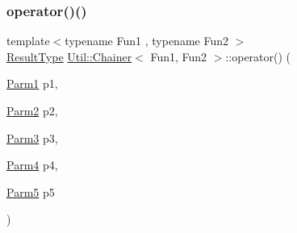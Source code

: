 \mbox{\label{classUtil_1_1Chainer_a3aee5b0f14ad8a15d167dd319019a01a}} 
\subsubsection{\texorpdfstring{operator()()}{operator()()}\hspace{0.1cm}{\footnotesize\ttfamily [17/18]}}
{\footnotesize\ttfamily template$<$typename Fun1 , typename Fun2 $>$ \\
\mbox{\hyperlink{classUtil_1_1Chainer_a2c8d88a77b8ba93eb915dc799ddafbb9}{Result\+Type}} \mbox{\hyperlink{classUtil_1_1Chainer}{Util\+::\+Chainer}}$<$ Fun1, Fun2 $>$\+::operator() (\begin{DoxyParamCaption}\item[{\mbox{\hyperlink{classUtil_1_1Chainer_a3e09b2267dabdd8d12070b09c47749c6}{Parm1}}}]{p1,  }\item[{\mbox{\hyperlink{classUtil_1_1Chainer_a1bfb0e8f35679278c85d232a74a107ff}{Parm2}}}]{p2,  }\item[{\mbox{\hyperlink{classUtil_1_1Chainer_ac28811d7153f7b7cf837f7b8626436c8}{Parm3}}}]{p3,  }\item[{\mbox{\hyperlink{classUtil_1_1Chainer_a82e756f3083e3883a05644425474f789}{Parm4}}}]{p4,  }\item[{\mbox{\hyperlink{classUtil_1_1Chainer_ac5fdddd223aac1cfb37abd6d681ddf69}{Parm5}}}]{p5 }\end{DoxyParamCaption})\hspace{0.3cm}{\ttfamily [inline]}}

\mbox{\label{classUtil_1_1Chainer_a3aee5b0f14ad8a15d167dd319019a01a}} 
